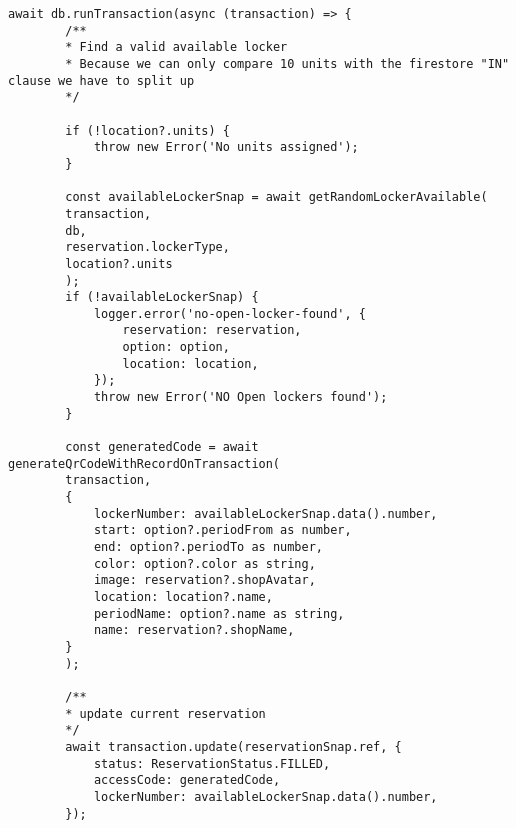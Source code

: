 \begin{lstlisting}[caption={Voltooide betaling roept de creatie QR-code methode op. Hierbij gebeurt een status update van de vooraf aangemaakte reservatie.}, label={lst:voltooidebetaling}]
    await db.runTransaction(async (transaction) => {
        /**
        * Find a valid available locker
        * Because we can only compare 10 units with the firestore "IN" clause we have to split up
        */
        
        if (!location?.units) {
            throw new Error('No units assigned');
        }
        
        const availableLockerSnap = await getRandomLockerAvailable(
        transaction,
        db,
        reservation.lockerType,
        location?.units
        );
        if (!availableLockerSnap) {
            logger.error('no-open-locker-found', {
                reservation: reservation,
                option: option,
                location: location,
            });
            throw new Error('NO Open lockers found');
        }
        
        const generatedCode = await generateQrCodeWithRecordOnTransaction(
        transaction,
        {
            lockerNumber: availableLockerSnap.data().number,
            start: option?.periodFrom as number,
            end: option?.periodTo as number,
            color: option?.color as string,
            image: reservation?.shopAvatar,
            location: location?.name,
            periodName: option?.name as string,
            name: reservation?.shopName,
        }
        );
        
        /**
        * update current reservation
        */
        await transaction.update(reservationSnap.ref, {
            status: ReservationStatus.FILLED,
            accessCode: generatedCode,
            lockerNumber: availableLockerSnap.data().number,
        });
\end{lstlisting}




